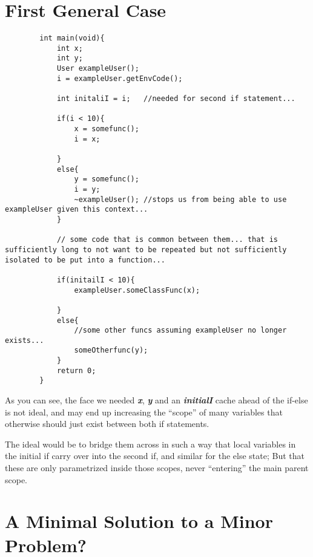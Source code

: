 \documentclass{article}
\newcommand{\textbfit}[1]{\textbf{\textit{#1}}}
\begin{document}
    \section{First General Case}
    \begin{lstlisting}
        int main(void){
            int x;
            int y;
            User exampleUser();
            i = exampleUser.getEnvCode();

            int initaliI = i;   //needed for second if statement...

            if(i < 10){
                x = somefunc();
                i = x;

            }
            else{
                y = somefunc();
                i = y;
                ~exampleUser(); //stops us from being able to use exampleUser given this context...
            }

            // some code that is common between them... that is sufficiently long to not want to be repeated but not sufficiently isolated to be put into a function...

            if(initailI < 10){
                exampleUser.someClassFunc(x);

            }
            else{
                //some other funcs assuming exampleUser no longer exists...
                someOtherfunc(y);
            }
            return 0;
        }
    \end{lstlisting}

        As you can see, the face we needed \textbfit{x}, \textbfit{y} and an \textbfit{initialI} cache ahead of the if-else is not ideal, and may end up increasing the ``scope'' of many variables that otherwise should just exist between both if statements.

    \bigskip
        The ideal would be to bridge them across in such a way that local variables in the initial if carry over into the second if, and similar for the else state; But that these are only parametrized inside those scopes, never ``entering'' the main parent scope.

    \newpage
    \section{A Minimal Solution to a Minor Problem?}
\end{document}
